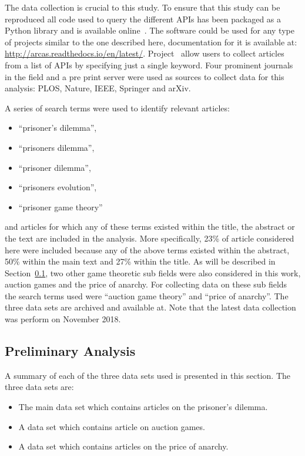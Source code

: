 \documentclass{article}
\theoremstyle{definition}
\begin{document}
The data collection is crucial to this study. To ensure that this study can be
reproduced all code used to query the different APIs has been packaged as a Python library and is
available online~\cite{nikoleta_2017}. The software could be used for any type of
projects similar to the one described here, documentation for it is available at:
\url{http://arcas.readthedocs.io/en/latest/}.
Project~\cite{nikoleta_2017} allow users to collect articles from a list of APIs by
specifying just a single keyword. Four prominent journals in the field and a
pre print server were used as sources to collect data for this analysis:
PLOS, Nature, IEEE, Springer and arXiv.

A series of search terms were used to identify relevant articles:

\begin{itemize}
    \item ``prisoner's dilemma'',
    \item ``prisoners dilemma'',
    \item ``prisoner dilemma'',
    \item ``prisoners evolution'',
    \item ``prisoner game theory''
\end{itemize}

and articles for which any of these terms existed within the title, the abstract
or the text are included in the analysis. More specifically, 23\% of article
considered here were included because any of the above terms existed within
the abstract, 50\% within the main text and 27\% within the title.
As will be described in Section~\ref{section:preliminary_analysis}, two other
game theoretic sub fields were also considered in this work, auction games and the
price of anarchy. For collecting data on these sub fields the search terms used
were ``auction game theory'' and ``price of anarchy''. The three data sets
are archived and available at. %
Note that the latest data collection was perform on November
2018.%

\subsection{Preliminary Analysis}\label{section:preliminary_analysis}

A summary of each of the three data sets used is presented in this section.
The three data sets are:

\begin{itemize}
    \item The main data set which contains articles on the prisoner's dilemma.
    \item A data set which contains article on auction games.
    \item A data set which contains articles on the price of anarchy.
\end{itemize}
\end{document}
